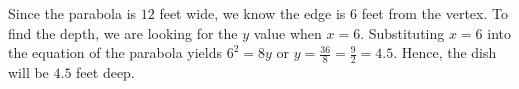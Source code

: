 \documentclass{ximera}
\begin{document}
\begin{example}
\begin{explanation}
\begin{image}

\end{image}

Since the parabola is $12$ feet wide, we know the edge is $6$ feet from the vertex.  To find the depth, we are looking for the $y$ value when $x=6$.  Substituting $x=6$ into the equation of the parabola yields $6^2 = 8y$ or $y = \frac{36}{8} = \frac{9}{2} = 4.5$.  Hence, the dish will be  $4.5$ feet deep. 
\end{explanation}
\end{example}



\closegraphsfile
\end{document}
